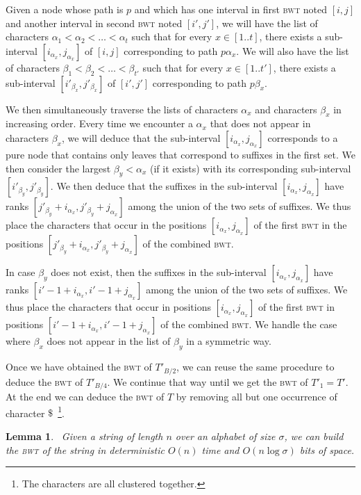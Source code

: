 \documentclass[a4paper]{article}
\newtheorem{lemma}{Lemma}
\begin{document}
Given a node whose path is $p$ and which has 
one interval in first \textsc{bwt} noted $[i,j]$ and another interval in second 
\textsc{bwt} noted $[i',j']$, we will have the list of characters 
$\alpha_1<\alpha_2<\ldots <\alpha_{t}$ such that for every $x\in[1..t]$, 
there exists a sub-interval $[i_{\alpha_x},j_{\alpha_x}]$ of $[i,j]$ 
corresponding to path $p\alpha_x$.  
We will also have the list of characters 
$\beta_1<\beta_2<\ldots <\beta_{t'}$ such that for every $x\in[1..t']$, 
there exists a sub-interval $[i'_{\beta_x},j'_{\beta_x}]$ of $[i',j']$ 
corresponding to path $p\beta_x$.  

We then simultaneously traverse the lists of characters $\alpha_x$ 
and characters $\beta_x$ in increasing order. Every time we encounter 
a $\alpha_x$ that does not appear in characters $\beta_x$, we will 
deduce that the sub-interval $[i_{\alpha_x},j_{\alpha_x}]$ corresponds 
to a pure node that contains only leaves that correspond to suffixes 
in the first set. 
We then consider the largest $\beta_y<\alpha_x$ (if it exists) with its corresponding 
sub-interval $[i'_{\beta_y},j'_{\beta_y}]$. We then deduce that the suffixes 
in the sub-interval $[i_{\alpha_x},j_{\alpha_x}]$ have ranks
$[j'_{\beta_y}+i_{\alpha_x},j'_{\beta_y}+j_{\alpha_x}]$ among the union
of the two sets of suffixes. We thus place the characters that occur 
in the positions $[i_{\alpha_x},j_{\alpha_x}]$ of the first \textsc{bwt} in 
the positions $[j'_{\beta_y}+i_{\alpha_x},j'_{\beta_y}+j_{\alpha_x}]$ 
of the combined \textsc{bwt}. 

In case $\beta_y$ does not exist, then the suffixes 
in the sub-interval $[i_{\alpha_x},j_{\alpha_x}]$ have ranks
$[i'-1+i_{\alpha_x},i'-1+j_{\alpha_x}]$ among the union
of the two sets of suffixes. We thus place the characters that occur 
in positions $[i_{\alpha_x},j_{\alpha_x}]$ of the first \textsc{bwt} in 
positions $[i'-1+i_{\alpha_x},i'-1+j_{\alpha_x}]$ of the combined \textsc{bwt}. 
We handle the case where $\beta_x$ does not appear in the list of $\beta_y$
in a symmetric way. 

Once we have obtained the \textsc{bwt} of $T'_{B/2}$, 
we can reuse the same procedure to deduce the \textsc{bwt}
 of $T'_{B/4}$. We continue that way until we get 
the \textsc{bwt} of $T'_{1}=T'$. At the end we can deduce the 
\textsc{bwt} of $T$ by removing all but one occurrence of 
character $\$$~\footnote{The characters are all clustered together.}. 
\begin{lemma}
~\label{lemma:linear_bwt}
Given a string of length $n$ over an alphabet of size $\sigma$, we can build the \textsc{bwt}
 of the string in deterministic $O(n)$ time and $O(n\log\sigma)$ bits of space. 
\end{lemma}
\end{document}
